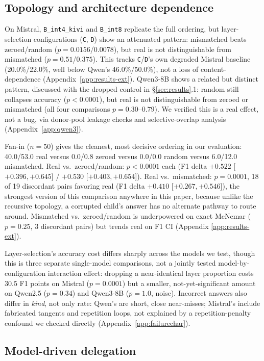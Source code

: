 \documentclass[11pt]{article}
\begin{document}
\subsection{Topology and architecture dependence}

On Mistral, \texttt{B\_int4\_kivi} and \texttt{B\_int8} replicate the
full ordering, but layer-selection configurations (\texttt{C},
\texttt{D}) show an attenuated pattern: mismatched beats zeroed/random
($p=0.0156$/$0.0078$), but real is not distinguishable from mismatched
($p=0.51$/$0.375$). This tracks \texttt{C}/\texttt{D}'s own degraded
Mistral baseline (20.0\%/22.0\%, well below Qwen's 46.0\%/50.0\%), not
a loss of content-dependence (Appendix~\ref{app:results-ext}). Qwen3-8B
shows a related but distinct pattern, discussed with the dropped
control in \S\ref{sec:results}.1: random still collapses accuracy
($p<0.0001$), but real is not distinguishable from zeroed or mismatched
(all four comparisons $p=0.30$--$0.79$). We verified this is a real
effect, not a bug, via donor-pool leakage checks and selective-overlap
analysis (Appendix~\ref{app:qwen3}).

Fan-in ($n=50$) gives the cleanest, most decisive ordering in our
evaluation: 40.0/53.0 real versus 0.0/0.8 zeroed versus 0.0/0.0 random
versus 6.0/12.0 mismatched. Real vs.\ zeroed/random: $p<0.0001$ each
(F1 delta $+0.522$ [$+0.396,+0.645$] / $+0.530$ [$+0.403,+0.654$]).
Real vs.\ mismatched: $p=0.0001$, 18 of 19 discordant pairs favoring
real (F1 delta $+0.410$ [$+0.267,+0.546$]), the strongest version of
this comparison anywhere in this
paper, because unlike the recursive topology, a corrupted child's
answer has no alternate pathway to route around. Mismatched
vs.\ zeroed/random is underpowered on exact McNemar ($p=0.25$, 3
discordant pairs) but trends real on F1 CI (Appendix
\ref{app:results-ext}).

Layer-selection's accuracy cost differs sharply across the models we
test, though this is three separate single-model comparisons, not a
jointly tested model-by-configuration interaction effect: dropping a
near-identical layer proportion costs 30.5 F1 points on Mistral
($p=0.0001$) but a smaller, not-yet-significant amount on Qwen2.5
($p=0.34$) and Qwen3-8B ($p=1.0$, noise). Incorrect answers
also differ in \emph{kind}, not only rate: Qwen's are short, close
near-misses; Mistral's include fabricated tangents and repetition
loops, not explained by a repetition-penalty confound we checked
directly (Appendix~\ref{app:failurechar}).

\subsection{Model-driven delegation}
\end{document}
